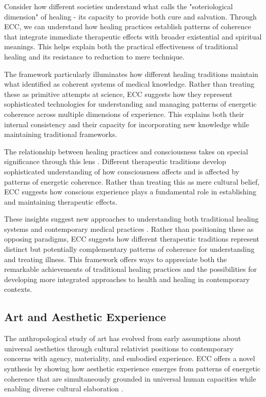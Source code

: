 \begin{refsection}
Consider how different societies understand what \cite{good1994medicine} calls the "soteriological dimension" of healing - its capacity to provide both cure and salvation. Through ECC, we can understand how healing practices establish patterns of coherence that integrate immediate therapeutic effects with broader existential and spiritual meanings. This helps explain both the practical effectiveness of traditional healing and its resistance to reduction to mere technique.

The framework particularly illuminates how different healing traditions maintain what \cite{leslie1976asian} identified as coherent systems of medical knowledge. Rather than treating these as primitive attempts at science, ECC suggests how they represent sophisticated technologies for understanding and managing patterns of energetic coherence across multiple dimensions of experience. This explains both their internal consistency and their capacity for incorporating new knowledge while maintaining traditional frameworks.

The relationship between healing practices and consciousness takes on special significance through this lens \cite{csordas1993somatic}. Different therapeutic traditions develop sophisticated understanding of how consciousness affects and is affected by patterns of energetic coherence. Rather than treating this as mere cultural belief, ECC suggests how conscious experience plays a fundamental role in establishing and maintaining therapeutic effects.

These insights suggest new approaches to understanding both traditional healing systems and contemporary medical practices \cite{kleinman1980patients}. Rather than positioning these as opposing paradigms, ECC suggests how different therapeutic traditions represent distinct but potentially complementary patterns of coherence for understanding and treating illness. This framework offers ways to appreciate both the remarkable achievements of traditional healing practices and the possibilities for developing more integrated approaches to health and healing in contemporary contexts.

\subsection{Art and Aesthetic Experience}

The anthropological study of art has evolved from early assumptions about universal aesthetics through cultural relativist positions to contemporary concerns with agency, materiality, and embodied experience. ECC offers a novel synthesis by showing how aesthetic experience emerges from patterns of energetic coherence that are simultaneously grounded in universal human capacities while enabling diverse cultural elaboration \cite{gell1998art}.


\end{refsection}
